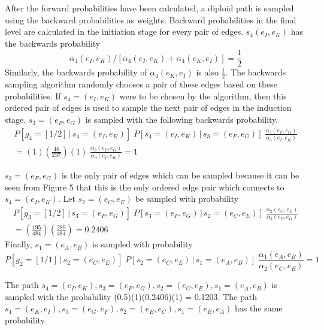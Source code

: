 \documentclass[a4paper,11pt,twoside,abstraction,titlepage]{article}
\begin{document}
\vspace{8pt}
\noindent After the forward probabilities have been calculated, a diploid path is sampled using the backward probabilities as weights.  Backward probabilities in the final level are calculated in the initiation stage for every pair of edges.  $s_4(e_I,e_K)$ has the backwards probability 
\vspace{-2pt}
\begin{equation*}
\alpha_4(e_I,e_K)/[\alpha_4(e_I,e_K) + \alpha_4(e_K,e_I)] = \frac{1}{2}
\end{equation*}
\vspace{2pt}
\noindent Similarly, the backwards probability of $\alpha_4(e_K,e_I)$ is also $\frac{1}{2}$.  The backwards sampling algorithm randomly chooses a pair of these edges based on these probabilities. If $s_4=(e_I,e_K)$ were to be chosen by the algorithm, then this ordered pair of edges is used to sample the next pair of edges in the induction stage.  $s_3 = (e_F,e_G)$ is sampled with the following backwards probability.
\begin{gather*}
P[g_4=[1/2] \,|\,s_4=(e_I,e_K)] \;P[s_4=(e_I,e_K)\,|\,s_3=(e_F,e_G)] \;\frac{\alpha_3(e_F,e_G)}{\alpha_4(e_I,e_K)}  \\
 = (1)\left(\frac{46}{237}\right)(1) \; \frac{\alpha_3(e_F,e_G)}{\alpha_4(e_I,e_K)} = 1
\end{gather*}

\vspace{2pt}
\noindent $s_3 = (e_F,e_G)$ is the only pair of edges which can be sampled because it can be seen from Figure 5 that this is the only ordered edge pair which connects to $s_4=(e_I,e_K)$.  Let $s_2 = (e_C, e_E)$ be sampled with probability
\begin{gather*}
P[g_3=[1/2] \,|\,s_3=(e_F,e_G)] \;P[s_3=(e_F,e_G)\,|\,s_2 = (e_C, e_E)] \;\frac{\alpha_2(e_C, e_E)}{\alpha_3(e_F,e_G)}  \\
 = \left(\frac{195}{484}\right) \!\! \left(\frac{289}{484}\right) = 0.2406
\end{gather*}
\vspace{5pt}
\noindent Finally, $s_1 = (e_A,e_B)$ is sampled with probability
\vspace{-5pt}
\begin{equation*}
P[g_2=[1/1] \,|\,s_2=(e_C,e_E)] \;P[s_2=(e_C,e_E)\,|\,s_1 = (e_A,e_B)] \;\frac{\alpha_1(e_A, e_B)}{\alpha_2(e_C,e_E)} = 1
\end{equation*}

\noindent The path $s_4=(e_I,e_K), s_3 = (e_F,e_G), s_2=(e_C,e_E), s_1 = (e_A,e_B)$ is sampled with the probability (0.5)(1)(0.2406)(1) = 0.1203.  The path  $s_4=(e_K,e_I), s_3 = (e_G,e_F), s_2=(e_E,e_C), s_1 = (e_B,e_A)$ has the same probability.
\end{document}
